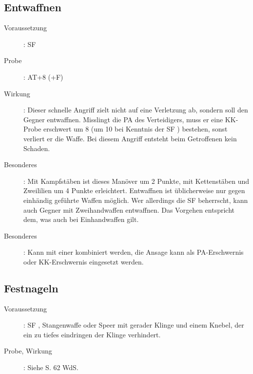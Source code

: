 \subsection{Entwaffnen }
\label{chap.bAT.entwaffnen}
\begin{description}
    \item[Voraussetzung]: SF 
    \item[Probe]: AT+8 (+F)
    \item[Wirkung]: Dieser schnelle Angriff zielt nicht auf eine Verletzung ab,
        sondern soll den Gegner entwaffnen. Misslingt die PA des Verteidigers,
        muss er eine KK-Probe erschwert um 8 (um 10 bei Kenntnis der SF
        ) bestehen, sonst verliert er die
        Waffe. Bei diesem Angriff entsteht beim Getroffenen kein Schaden.
    \item[Besonderes]: Mit Kampfstäben ist dieses Manöver um 2 Punkte, mit
        Kettenstäben und Zweililien um 4 Punkte erleichtert.  Entwaffnen ist
        üblicherweise nur gegen einhändig geführte Waffen möglich. Wer
        allerdings die SF  beherrscht,
        kann auch Gegner mit Zweihandwaffen entwaffnen.  Das Vorgehen
        entspricht dem, was auch bei Einhandwaffen gilt.
    \item[Besonderes]: Kann mit einer  kombiniert werden,
        die Ansage kann als PA-Erschwernis oder KK-Erschwernis eingesetzt
        werden.
\end{description}

\subsection{Festnageln }
\begin{description}
    \item[Voraussetzung]: SF , Stangenwaffe oder Speer
        mit gerader Klinge und einem Knebel, der ein zu tiefes eindringen der
        Klinge verhindert.
    \item[Probe, Wirkung]: Siehe S. 62 WdS.
\end{description}

